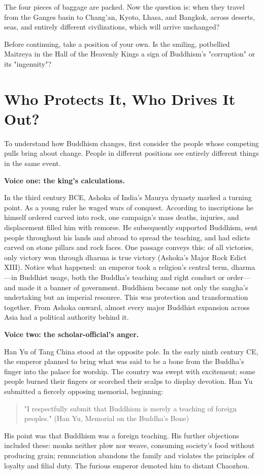 The four pieces of baggage are packed. Now the question is: when they travel from the Ganges basin to Chang'an, Kyoto, Lhasa, and Bangkok, across deserts, seas, and entirely different civilizations, which will arrive unchanged?

Before continuing, take a position of your own. Is the smiling, potbellied Maitreya in the Hall of the Heavenly Kings a sign of Buddhism's "corruption" or its "ingenuity"?

\section{Who Protects It, Who Drives It Out?}
To understand how Buddhism changes, first consider the people whose competing pulls bring about change. People in different positions see entirely different things in the same event.

\textbf{Voice one: the king's calculations.}

In the third century BCE, Ashoka of India's Maurya dynasty marked a turning point. As a young ruler he waged wars of conquest. According to inscriptions he himself ordered carved into rock, one campaign's mass deaths, injuries, and displacement filled him with remorse. He subsequently supported Buddhism, sent people throughout his lands and abroad to spread the teaching, and had edicts carved on stone pillars and rock faces. One passage conveys this: of all victories, only victory won through dharma is true victory (Ashoka's Major Rock Edict XIII). Notice what happened: an emperor took a religion's central term, dharma---in Buddhist usage, both the Buddha's teaching and right conduct or order---and made it a banner of government. Buddhism became not only the sangha's undertaking but an imperial resource. This was protection and transformation together. From Ashoka onward, almost every major Buddhist expansion across Asia had a political authority behind it.

\textbf{Voice two: the scholar-official's anger.}

Han Yu of Tang China stood at the opposite pole. In the early ninth century CE, the emperor planned to bring what was said to be a bone from the Buddha's finger into the palace for worship. The country was swept with excitement; some people burned their fingers or scorched their scalps to display devotion. Han Yu submitted a fiercely opposing memorial, beginning:

\begin{quote}
"I respectfully submit that Buddhism is merely a teaching of foreign peoples." (Han Yu, Memorial on the Buddha's Bone)
\end{quote}
His point was that Buddhism was a foreign teaching. His further objections included these: monks neither plow nor weave, consuming society's food without producing grain; renunciation abandons the family and violates the principles of loyalty and filial duty. The furious emperor demoted him to distant Chaozhou.

